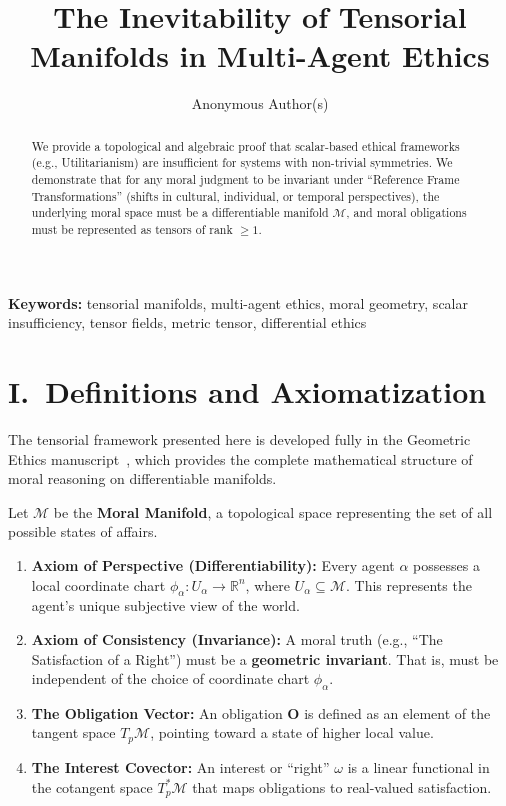 \documentclass[12pt]{article}
\title{The Inevitability of Tensorial Manifolds in Multi-Agent Ethics}
\author{Anonymous Author(s)}
\date{}
\theoremstyle{remark}
\begin{document}
\maketitle

\noindent\textbf{Keywords:} tensorial manifolds, multi-agent ethics, moral geometry, scalar insufficiency, tensor fields, metric tensor, differential ethics

\begin{abstract}
We provide a topological and algebraic proof that scalar-based ethical
frameworks (e.g., Utilitarianism) are insufficient for systems with non-trivial
symmetries. We demonstrate that for any moral judgment to be invariant under
``Reference Frame Transformations'' (shifts in cultural, individual, or temporal
perspectives), the underlying moral space must be a differentiable manifold
$\mathcal{M}$, and moral obligations must be represented as tensors of rank
$\geq 1$.
\end{abstract}

\section*{I.\ Definitions and Axiomatization}

The tensorial framework presented here is developed fully in the Geometric Ethics manuscript~\cite{bond2026ge}, which provides the complete mathematical structure of moral reasoning on differentiable manifolds.

Let $\mathcal{M}$ be the \textbf{Moral Manifold}, a topological space
representing the set of all possible states of affairs.

\begin{enumerate}
    \item \textbf{Axiom of Perspective (Differentiability):} Every agent
    $\alpha$ possesses a local coordinate chart $\phi_\alpha : U_\alpha \to
    \mathbb{R}^n$, where $U_\alpha \subseteq \mathcal{M}$. This represents the
    agent's unique subjective view of the world.

    \item \textbf{Axiom of Consistency (Invariance):} A moral truth (e.g.,
    ``The Satisfaction of a Right'') must be a \textbf{geometric invariant}.
    That is, must be independent of the choice of coordinate chart
    $\phi_\alpha$.

    \item \textbf{The Obligation Vector:} An obligation $\mathbf{O}$ is defined
    as an element of the tangent space $T_p\mathcal{M}$, pointing toward a
    state of higher local value.

    \item \textbf{The Interest Covector:} An interest or ``right'' $\omega$ is
    a linear functional in the cotangent space $T_p^*\mathcal{M}$ that maps
    obligations to real-valued satisfaction.
\end{enumerate}
\end{document}
